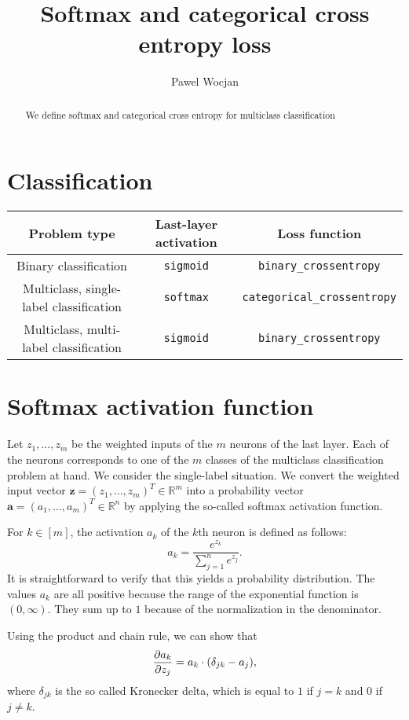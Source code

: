 \documentclass[12pt]{article}
\title{Softmax and categorical cross entropy loss}
\author{Pawel Wocjan}
\newcommand{\R}{\mathbb{R}}
\begin{document}
\maketitle


\begin{abstract}
We define softmax and categorical cross entropy for multiclass classification 
\end{abstract}

\section{Classification}

\begin{tabular}{|c|c|c|}
\hline
Problem type & Last-layer activation & Loss function \\ \hline \hline
Binary classification & \texttt{sigmoid} & \texttt{binary\_crossentropy} \\ \hline
Multiclass, single-label classification & \texttt{softmax} & \texttt{categorical\_crossentropy} \\ \hline
Multiclass, multi-label classification & \texttt{sigmoid} & \texttt{binary\_crossentropy} \\ \hline
\end{tabular}

\section{Softmax activation function}

Let $z_1,\ldots,z_m$ be the weighted inputs of the $m$ neurons of the last layer. Each of the neurons corresponds to one of the $m$ classes of the multiclass classification problem at hand. We consider the single-label situation. We convert the weighted input vector $\boldsymbol{z}=(z_1,\ldots,z_m)^T\in\R^m$ into a probability vector $\boldsymbol{a}=(a_1,\ldots,a_m)^T\in\R^n$ by applying the so-called softmax activation function. 

For $k\in [m]$, the activation $a_k$ of the $k$th neuron is defined as follows:
\begin{equation}
a_k = \frac{e^{z_k}}{\sum_{j=1}^n e^{z_j}}.
\end{equation}
It is straightforward to verify that this yields a probability distribution. The values $a_k$ are all positive because the range of the exponential function is $(0,\infty)$. They sum up to $1$ because of the normalization in the denominator.

Using the product and chain rule, we can show that
\begin{equation}\label{eq:aoverz}
{\partial a_k \over \partial z_j} = a_k \cdot (\delta_{jk} - a_j),
\end{equation}
where $\delta_{jk}$ is the so called Kronecker delta, which is equal to $1$ if $j=k$ and $0$ if $j\neq k$.
\end{document}
